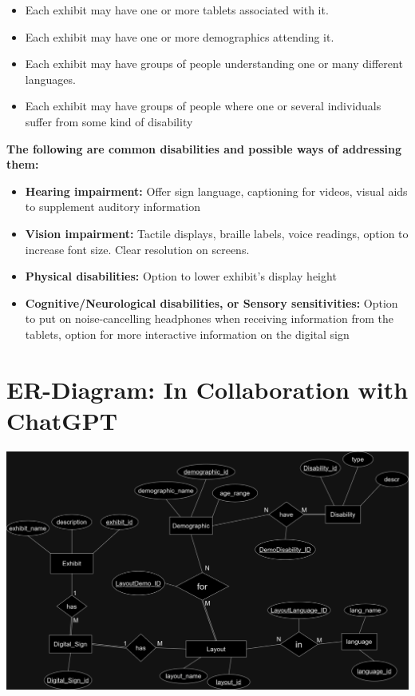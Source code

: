 \documentclass{exam}
\begin{document}
\begin{itemize}
\item Each exhibit may have one or more tablets associated with it.
\item Each exhibit may have one or more demographics attending it.
\item Each exhibit may have groups of people understanding one or many different languages.
\item Each exhibit may have groups of people where one or several individuals suffer from some kind of disability
\end{itemize}
\bigskip

\pagebreak
\textbf{\large{The following are common disabilities and possible ways of addressing them:}}\\
\begin{itemize}
\item \textbf{Hearing impairment:} Offer sign language, captioning for videos, visual aids to supplement auditory information
\item \textbf{Vision impairment:} Tactile displays, braille labels, voice readings, option to increase font size. Clear resolution on screens.
\item \textbf{Physical disabilities:} Option to lower exhibit's display height
\item \textbf{Cognitive/Neurological disabilities, or Sensory sensitivities:} Option to put on noise-cancelling headphones when receiving information from the tablets, option for more interactive information on the digital sign
\end{itemize}
\bigskip

\pagebreak
\section*{ER-Diagram: In Collaboration with ChatGPT}
\bigskip
\begin{center}
\includegraphics[scale=0.3]{science_center.png}
\end{center}
\bigskip
\end{document}
